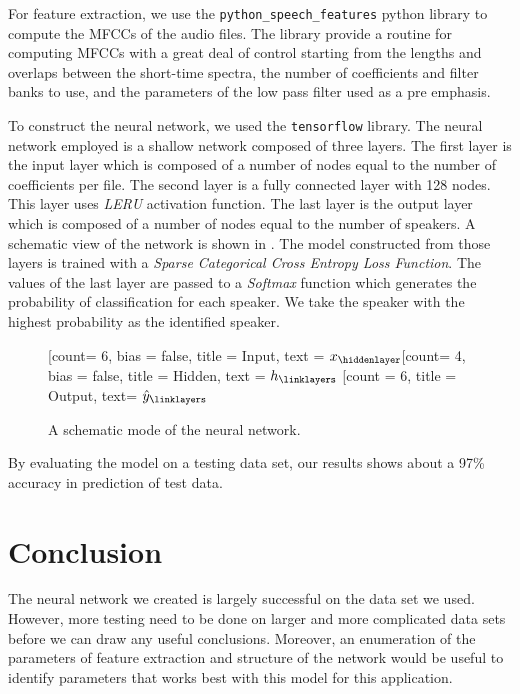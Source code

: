\documentclass[twocolumn]{article}
\begin{document}
For feature extraction, we use the \texttt{python\_speech\_features} python
library to compute the MFCCs of the audio files. The library provide a routine
for computing MFCCs with a great deal of control starting from the lengths and
overlaps between the short-time spectra, the number of coefficients and filter
banks to use, and the parameters of the low pass filter used as a pre emphasis.

To construct the neural network, we used the \texttt{tensorflow} library. The
neural network employed is a shallow network composed of three layers. The
first layer is the input layer which is composed of a number of nodes equal to
the number of coefficients per file. The second layer is a fully connected
layer with 128 nodes. This layer uses \emph{LERU} activation function. The last
layer is the output layer which is composed of a number of nodes equal to the
number of speakers. A schematic view of the network is shown in
. The model constructed from those layers is trained
with a \emph{Sparse Categorical Cross Entropy Loss Function}. The values of the
last layer are passed to a \emph{Softmax} function which generates the
probability of classification for each speaker. We take the speaker with the
highest probability as the identified speaker.

\begin{figure}
\begin{center}
\begin{neuralnetwork}[height = 6]
  \newcommand{\x}[2]{$x_#2$}
  \newcommand{\y}[2]{$\hat{y}_#2$}
  \newcommand{\hidden}[2]{\small $h_#2$}
  [count= 6, bias = false, title = Input, text = \x]
  \hiddenlayer[count= 4, bias = false, title = Hidden, text = \hidden]
  \linklayers
  \outputlayer[count = 6, title = Output, text= \y]
  \linklayers
\end{neuralnetwork}
\end{center}
\caption{A schematic mode of the neural network.}
\label{fig:NeuralNetwork}
\end{figure}

By evaluating the model on a testing data set, our results shows about a 97\%
accuracy in prediction of test data.

\section{Conclusion}
\label{sec:Conclusion}

The neural network we created is largely successful on the data set we used.
However, more testing need to be done on larger and more complicated data sets
before we can draw any useful conclusions. Moreover, an enumeration of the
parameters of feature extraction and structure of the network would be useful
to identify parameters that works best with this model for this application.

\printbibliography
\end{document}
